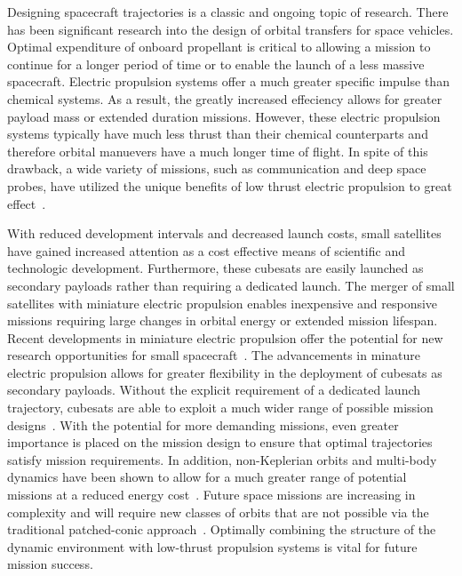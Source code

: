 \documentclass[smallcondensed]{svjour3}
\begin{document}


Designing spacecraft trajectories is a classic and ongoing topic of research.
There has been significant research into the design of orbital transfers for space vehicles.
Optimal expenditure of onboard propellant is critical to allowing a mission to continue for a longer period of time or to enable the launch of a less massive spacecraft.
Electric propulsion systems offer a much greater specific impulse than chemical systems.
As a result, the greatly increased effeciency allows for greater payload mass or extended duration missions.
However, these electric propulsion systems typically have much less thrust than their chemical counterparts and therefore orbital manuevers have a much longer time of flight.
In spite of this drawback, a wide variety of missions, such as communication and deep space probes, have utilized the unique benefits of low thrust electric propulsion to great effect~\cite{choueiri2009}.

With reduced development intervals and decreased launch costs, small satellites have gained increased attention as a cost effective means of scientific and technologic development. 
Furthermore, these cubesats are easily launched as secondary payloads rather than requiring a dedicated launch.
The merger of small satellites with miniature electric propulsion enables inexpensive and responsive missions requiring large changes in orbital energy or extended mission lifespan.
Recent developments in miniature electric propulsion offer the potential for new research opportunities for small spacecraft~\cite{haque2013}.
The advancements in minature electric propulsion allows for greater flexibility in the deployment of cubesats as secondary payloads.
Without the explicit requirement of a dedicated launch trajectory, cubesats are able to exploit a much wider range of possible mission designs~\cite{folta2015}.
With the potential for more demanding missions, even greater importance is placed on the mission design to ensure that optimal trajectories satisfy mission requirements. 
In addition, non-Keplerian orbits and multi-body dynamics have been shown to allow for a much greater range of potential missions at a reduced energy cost~\cite{folta2015,koon2011}.
Future space missions are increasing in complexity and will require new classes of orbits that are not possible via the traditional patched-conic approach~\cite{ross2006,gomez2001}.
Optimally combining the structure of the dynamic environment with low-thrust propulsion systems is vital for future mission success.
\end{document}
